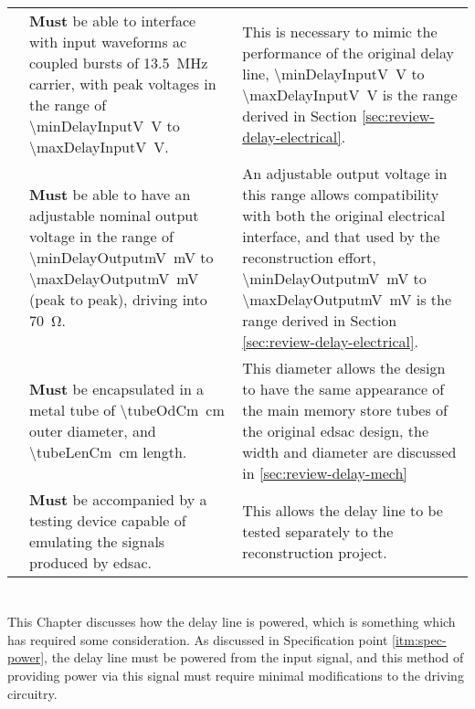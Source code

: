 \begin{longtable}{r  >{\raggedright}p{}  >{\raggedright}p{} }
	{specNo}\thespecNo\label{itm:spec-skew-input-v} & \textbf{Must} be able to interface with input waveforms \gls{ac} coupled bursts of \SI{13.5}{\mega\hertz} carrier, with peak voltages in the range of \SI{\minDelayInputV}{\volt} to \SI{\maxDelayInputV}{\volt}. & This is necessary to mimic the performance of the original delay line, \SI{\minDelayInputV}{\volt} to \SI{\maxDelayInputV}{\volt} is the range derived in Section \ref{sec:review-delay-electrical}. \tabularnewline
	
	{specNo}\thespecNo\label{itm:spec-skew-output-v} & \textbf{Must} be able to have an adjustable nominal output voltage in the range of \SI{\minDelayOutputmV}{\milli\volt} to \SI{\maxDelayOutputmV}{\milli\volt} (peak to peak), driving into \SI{70}{\ohm}. & An adjustable output voltage in this range allows compatibility with both the original electrical interface, and that used by the reconstruction effort, \SI{\minDelayOutputmV}{\milli\volt} to \SI{\maxDelayOutputmV}{\milli\volt} is the range derived in Section \ref{sec:review-delay-electrical}. \tabularnewline
	
	{specNo}\thespecNo\label{itm:spec-phys-size} & \textbf{Must} be encapsulated in a metal tube of \SI{\tubeOdCm}{\centi\metre} outer diameter, and \SI{\tubeLenCm}{\centi\metre} length. & This diameter allows the design to have the same appearance of the main memory store tubes of the original \gls{edsac} design, the width and diameter are discussed in \ref{sec:review-delay-mech} \tabularnewline
	
	{specNo}\thespecNo\label{itm:spec-testing} & \textbf{Must} be accompanied by a testing device capable of emulating the signals produced by \gls{edsac}. & This allows the delay line to be tested separately to the reconstruction project. \tabularnewline
	
	
\end{longtable}

\chapter{} \label{sec:power}

This Chapter discusses how the delay line is powered, which is something which has required some consideration. As discussed in Specification point \ref{itm:spec-power}, the delay line must be powered from the input signal, and this method of providing power via this signal must require minimal modifications to the driving circuitry.

